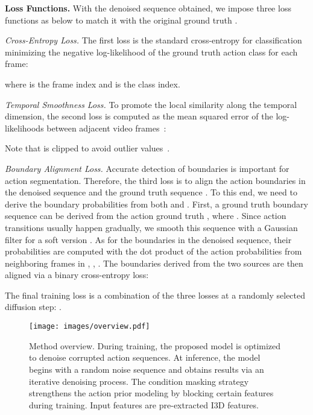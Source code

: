 \documentclass[10pt,twocolumn,letterpaper]{article}
\begin{document}
\textbf{Loss Functions.}
With the denoised sequence  obtained, we impose three loss functions as below to match it with the original ground truth .

\textit{Cross-Entropy Loss.} 
The first loss is the standard cross-entropy for classification minimizing the negative log-likelihood of the ground truth action class for each frame:

where  is the frame index and  is the class index.


\textit{Temporal Smoothness Loss.} 
To promote the local similarity along the temporal dimension, the second loss is computed as the mean squared error of the log-likelihoods between adjacent video frames~\cite{2019_CVPR_Farha,2020_PAMI_Li}:

Note that  is clipped to avoid outlier values~\cite{2019_CVPR_Farha}.



\textit{Boundary Alignment Loss.} 
Accurate detection of boundaries is important for action segmentation. 
Therefore, the third loss is to align the action boundaries in the denoised sequence  and the ground truth sequence .
To this end, we need to derive the boundary probabilities from both  and .
First, a ground truth boundary sequence  can be derived from the action ground truth , where .
Since action transitions usually happen gradually, we smooth this sequence with a Gaussian filter for a soft version . 
As for the boundaries in the denoised sequence, their probabilities are computed with the dot product of the action probabilities from neighboring frames in , \ie, .
The boundaries derived from the two sources are then aligned via a binary cross-entropy loss:


The final training loss is a combination of the three losses at a randomly selected diffusion step:
.






\begin{figure}[t]
\begin{center}
   \texttt{[image: images/overview.pdf]}
\end{center}
   \caption{Method overview. During training, the proposed model is optimized to denoise corrupted action sequences. At inference, the model begins with a random noise sequence and obtains results via an iterative denoising process. The condition masking strategy strengthens the action prior modeling by blocking certain features during training. Input features are pre-extracted I3D features.}
\label{fig:overview}
\end{figure}
\end{document}
